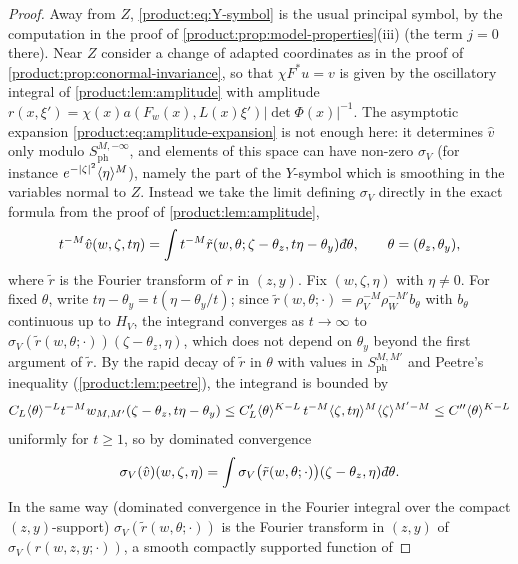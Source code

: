 \begin{proof}
Away from $Z$, \eqref{product:eq:Y-symbol} is the usual principal symbol, by the
computation in the proof of \cref{product:prop:model-properties}(iii) (the term
$j=0$ there). Near $Z$ consider a change of adapted coordinates as in the proof of
\cref{product:prop:conormal-invariance}, so that $\chi F^*u=v$ is given by the
oscillatory integral of \cref{product:lem:amplitude} with amplitude
$r(x,\xi')=\chi(x)a(F_w(x),L(x)\xi')|\det\Phi(x)|^{-1}$. The asymptotic expansion
\eqref{product:eq:amplitude-expansion} is not enough here: it determines $\hat v$
only modulo $S^{M,-\infty}_{\mathrm{ph}}$, and elements of this space can have
non-zero $\sigma_V$ (for instance $e^{-|\zeta|^2}\langle \eta\rangle^M$), namely the part of
the $Y$-symbol which is smoothing in the variables normal to $Z$. Instead we take
the limit defining $\sigma_V$ directly in the exact formula from the proof of
\cref{product:lem:amplitude},
\begin{equation*}
t^{-M}\hat v(w,\zeta,t\eta)=\int t^{-M}\tilde r(w,\theta;\zeta-\theta_z,
t\eta-\theta_y)\,\dbar\theta,\qquad\theta=(\theta_z,\theta_y),
\end{equation*}
where $\tilde r$ is the Fourier transform of $r$ in $(z,y)$. Fix $(w,\zeta,\eta)$
with $\eta\ne0$. For fixed $\theta$, write $t\eta-\theta_y=t(\eta-\theta_y/t)$;
since $\tilde r(w,\theta;\cdot)=\rho_V^{-M}\rho_W^{-M'}b_\theta$ with $b_\theta$
continuous up to $H_V$, the integrand converges as $t\to\infty$ to
$\sigma_V(\tilde r(w,\theta;\cdot))(\zeta-\theta_z,\eta)$, which does not depend on
$\theta_y$ beyond the first argument of $\tilde r$. By the rapid decay of $\tilde r$
in $\theta$ with values in $S^{M,M'}_{\mathrm{ph}}$ and Peetre's inequality
(\cref{product:lem:peetre}), the integrand is bounded by
\begin{equation*}
C_L\langle \theta\rangle^{-L}t^{-M}w_{M,M'}(\zeta-\theta_z,t\eta-\theta_y)\le
C'_L\langle \theta\rangle^{K-L}\,t^{-M}\langle \zeta,t\eta\rangle^M\langle \zeta\rangle^{M'-M}\le
C''\langle \theta\rangle^{K-L}
\end{equation*}
uniformly for $t\ge1$, so by dominated convergence
\begin{equation*}
\sigma_V(\hat v)(w,\zeta,\eta)=\int\sigma_V\big(\tilde r(w,\theta;\cdot)\big)
(\zeta-\theta_z,\eta)\,\dbar\theta.
\end{equation*}
In the same way (dominated convergence in the Fourier integral over the compact
$(z,y)$-support) $\sigma_V(\tilde r(w,\theta;\cdot))$ is the Fourier transform in
$(z,y)$ of $\sigma_V(r(w,z,y;\cdot))$, a smooth compactly supported function of

\end{proof}
